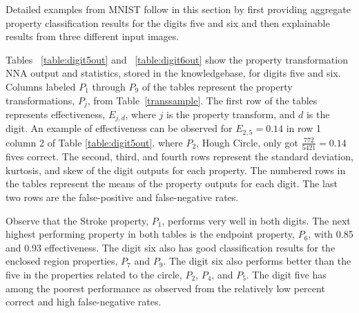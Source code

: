 \documentclass[conference]{IEEEtran}
\begin{document}
Detailed examples from MNIST follow in this section by first providing aggregate
property classification results for the digits five and six and then explainable
results from three different input images.

Tables ~\ref{table:digit5out} and ~\ref{table:digit6out} show the property
transformation NNA output and statistics, stored in the knowledgebase, for
digits five and six.  Columns labeled $P_1$ through $P_9$ of the tables
represent the property transformations, $P_j$, from Table~\ref{transsample}.
The first row of the tables represents effectiveness, $E_{j,d}$, where $j$ is
the property transform, and $d$ is the digit.  An example of effectiveness can
be observed for $E_{2,5}=0.14$ in row 1 column 2 of Table \ref{table:digit5out}.
where $P_2$, Hough Circle, only got $\frac{772}{5421}=0.14$ fives correct.   The
second, third, and fourth rows represent the standard deviation, kurtosis, and
skew of the digit outputs for each property.  The numbered rows in the tables
represent the means of the property outputs for each digit.  The last two rows
are the false-positive and false-negative rates.

Observe that the Stroke property, $P_1$, performs very well in both digits.  The
next highest performing property in both tables is the endpoint property, $P_6$,
with 0.85 and 0.93 effectiveness.  The digit six also has good classification
results for the enclosed region properties, $P_7$ and $P_9$.  The digit six also
performs better than the five in the properties related to the circle, $P_2$,
$P_4$, and $P_5$.  The digit five has among the poorest performance as observed
from the relatively low percent correct and high false-negative rates.
\end{document}
